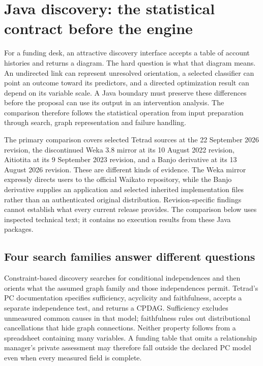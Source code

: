 \hypertarget{java-discovery-the-statistical-contract-before-the-engine}{%
\section{Java discovery: the statistical contract before the
engine}\label{java-discovery-the-statistical-contract-before-the-engine}}

\label{exec13:java-discovery}

For a funding desk, an attractive discovery interface accepts a table of
account histories and returns a diagram. The hard question is what that
diagram means. An undirected link can represent unresolved orientation,
a selected classifier can point an outcome toward its predictors, and a
directed optimization result can depend on its variable scale. A Java
boundary must preserve these differences before the proposal can use its
output in an intervention analysis. The comparison therefore follows the
statistical operation from input preparation through search, graph
representation and failure handling.

The primary comparison covers selected Tetrad sources at the 22
September 2026 revision, the discontinued Weka 3.8 mirror at its 10
August 2022 revision, Aitiotita at its 9 September 2023 revision, and a
Banjo derivative at its 13 August 2026 revision. These are different
kinds of evidence. The Weka mirror expressly directs users to the
official Waikato repository, while the Banjo derivative supplies an
application and selected inherited implementation files rather than an
authenticated original distribution. Revision-specific findings cannot
establish what every current release provides. The comparison below uses
inspected technical text; it contains no execution results from these
Java packages.
\citep{exec13_java_tetrad,exec13_java_weka,exec13_java_aitiotita,exec13_java_banjo}

\hypertarget{four-search-families-answer-different-questions}{%
\subsection{Four search families answer different
questions}\label{four-search-families-answer-different-questions}}

Constraint-based discovery searches for conditional independences and
then orients what the assumed graph family and those independences
permit. Tetrad's PC documentation specifies sufficiency, acyclicity and
faithfulness, accepts a separate independence test, and returns a CPDAG.
Sufficiency excludes unmeasured common causes in that model;
faithfulness rules out distributional cancellations that hide graph
connections. Neither property follows from a spreadsheet containing many
variables. A funding table that omits a relationship manager's private
assessment may therefore fall outside the declared PC model even when
every measured field is complete. \citep{exec13_java_tetrad}

